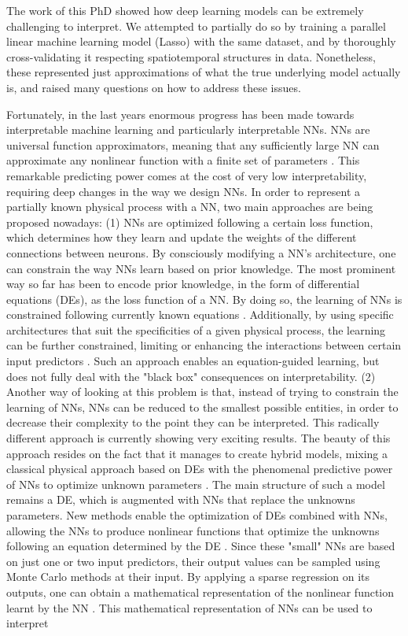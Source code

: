 The work of this PhD showed how deep learning models can be extremely challenging to interpret. We attempted to partially do so by training a parallel linear machine learning model (Lasso) with the same dataset, and by thoroughly cross-validating it respecting spatiotemporal structures in data. Nonetheless, these represented just approximations of what the true underlying model actually is, and raised many questions on how to address these issues. 

Fortunately, in the last years enormous progress has been made towards interpretable machine learning and particularly interpretable NNs. NNs are universal function approximators, meaning that any sufficiently large NN can approximate any nonlinear function with a finite set of parameters \citep{winkler_performance_2017}. This remarkable predicting power comes at the cost of very low interpretability, requiring deep changes in the way we design NNs. In order to represent a partially known physical process with a NN, two main approaches are being proposed nowadays: (1) NNs are optimized following a certain loss function, which determines how they learn and update the weights of the different connections between neurons. By consciously modifying a NN's architecture, one can constrain the way NNs learn based on prior knowledge. The most prominent way so far has been to encode prior knowledge, in the form of differential equations (DEs), as the loss function of a NN. By doing so, the learning of NNs is constrained following currently known equations \citep{raissi_physics_2017,karpatne_physics-guided_2018}. Additionally, by using specific architectures that suit the specificities of a given physical process, the learning can be further constrained, limiting or enhancing the interactions between certain input predictors \citep{karpatne_theory-guided_2017}. Such an approach enables an equation-guided learning, but does not fully deal with the "black box" consequences on interpretability. (2) Another way of looking at this problem is that, instead of trying to constrain the learning of NNs, NNs can be reduced to the smallest possible entities, in order to decrease their complexity to the point they can be interpreted. This radically different approach is currently showing very exciting results. The beauty of this approach resides on the fact that it manages to create hybrid models, mixing a classical physical approach based on DEs with the phenomenal predictive power of NNs to optimize unknown parameters \citep{rackauckas_universal_2020}. The main structure of such a model remains a DE, which is augmented with NNs that replace the unknowns parameters. New methods enable the optimization of DEs combined with NNs, allowing the NNs to produce nonlinear functions that optimize the unknowns following an equation determined by the DE \citep{raissi_physics_2017,rackauckas_universal_2020,bradbury_jax_2020}. Since these "small" NNs are based on just one or two input predictors, their output values can be sampled using Monte Carlo methods at their input. By applying a sparse regression on its outputs, one can obtain a mathematical representation of the nonlinear function learnt by the NN \citep{brunton_discovering_2016}. This mathematical representation of NNs can be used to interpret 